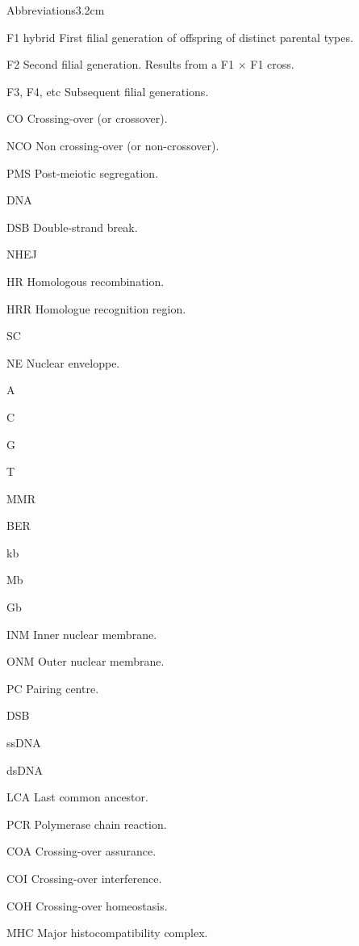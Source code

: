 
\begin{mclistof}{Abbreviations}{3.2cm}

\item[F1 hybrid] First filial generation of offspring of distinct parental types.
\item[F2] Second filial generation. Results from a F1 $\times$ F1 cross.
\item[F3, F4, etc] Subsequent filial generations.


\item[CO] Crossing-over (or crossover).
\item[NCO] Non crossing-over (or non-crossover).
\item[PMS] Post-meiotic segregation.
\item[DNA] 
\item[DSB] Double-strand break.
\item[NHEJ]
\item[HR] Homologous recombination.
\item[HRR] Homologue recognition region.
\item[SC] 
\item[NE] Nuclear enveloppe.
\item[A]
\item[C]
\item[G]
\item[T]
\item[MMR]
\item[BER]
\item[kb]
\item[Mb]
\item[Gb]
\item[INM] Inner nuclear membrane.
\item[ONM] Outer nuclear membrane.
\item[PC] Pairing centre.
\item[DSB]
\item[ssDNA]
\item[dsDNA]
\item[LCA] Last common ancestor.
\item[PCR] Polymerase chain reaction.
\item[COA] Crossing-over assurance.
\item[COI] Crossing-over interference.
\item[COH] Crossing-over homeostasis.
\item[MHC] Major histocompatibility complex.

\end{mclistof}

